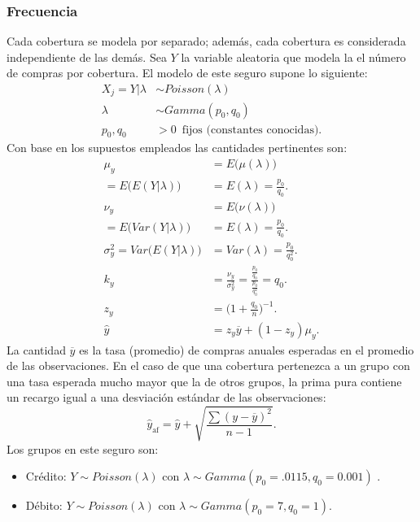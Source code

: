 \documentclass{article}
\begin{document}
\subsubsection*{ Frecuencia}
Cada cobertura se modela por separado; además, cada cobertura es considerada independiente de las demás. Sea $Y$ la variable aleatoria que modela la el número de compras por cobertura. El modelo de este seguro supone lo siguiente: 
\begin{align*}
    X_j = Y | \lambda &\sim Poisson(\lambda) \\
    \lambda &\sim Gamma(p_0, q_0) \\
    p_0, q_0 &> 0 \enspace \text{
     fijos (constantes conocidas)}.
\end{align*}
Con base en los supuestos empleados las cantidades pertinentes son: 
\begin{align*}
    \mu_y &= E \big ( \mu(\lambda) \big ) \\
    = E \big ( E ( Y | \lambda ) \big ) 
    &= E(\lambda)
    = \frac{p_0}{ q _0 } . \\
    \nu_ y &= E \big ( \nu(\lambda) \big ) \\
    = E \big ( Var(  Y | \lambda) \big ) 
    &= E (\lambda) 
    = \frac{p_0}{ q _0 } . \\
    \sigma^2_y = Var \big ( E ( Y| \lambda) \big ) 
    &= Var( \lambda) 
    = \frac{p_0}{q_0^2} . \\
    k_y &= \frac{\nu_y}{\sigma^2_y} = \frac{\frac{p_0}{q_0}}
    { \frac{p_0}{q_0^2} } = q_0 . \\
    z_y &= \big ( 1 + \frac{q_0}{n} \big )^{-1}.  \\
    \hat{y} &= z_y \overline{y} + (1 - z_y) \mu_y . 
\end{align*}
La cantidad $\overline{y}$ es la tasa  (promedio) de compras anuales esperadas en el promedio de las observaciones. En el caso de que una cobertura pertenezca a un grupo con una tasa esperada mucho mayor que la de otros grupos, la prima pura contiene un recargo igual a una desviación estándar de las observaciones: 
\begin{equation*}
    \hat{y}_{\text{af} } = \hat{y} + \sqrt{\frac{
    \sum ( y - \overline{y} )^2 }{n -1}} .
\end{equation*}
Los grupos en este seguro son:
\begin{itemize}
    \item Crédito: $Y \sim Poisson(\lambda)$ con 
    $\lambda \sim Gamma(p_0 = .0115, q_0 = 0.001)$ .
    \item Débito: $Y \sim Poisson(\lambda)$ con 
    $\lambda \sim Gamma(p_0 = 7, q_0 = 1)$. 
\end{itemize}
\end{document}
